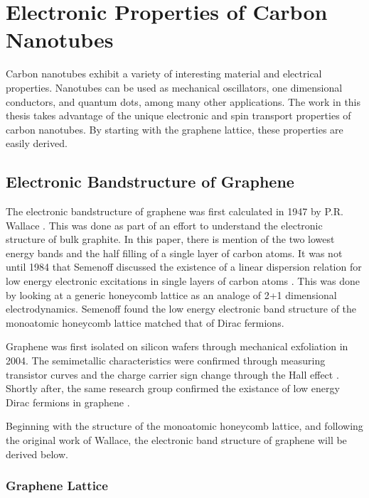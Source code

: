 
\chapter{Electronic Properties of Carbon Nanotubes}
\label{sec:CNT}

Carbon nanotubes exhibit a variety of interesting material and electrical properties. Nanotubes can be used as mechanical oscillators, one dimensional conductors, and quantum dots, among many other applications. The work in this thesis takes advantage of the unique electronic and spin transport properties of carbon nanotubes. By starting with the graphene lattice, these properties are easily derived. 

\section{Electronic Bandstructure of Graphene}

The electronic bandstructure of graphene was first calculated in 1947 by P.R. Wallace \cite{Wallace1947}. This was done as part of an effort to understand the electronic structure of bulk graphite. In this paper, there is mention of the two lowest energy bands and the half filling of a single layer of carbon atoms. It was not until 1984 that Semenoff discussed the existence of a linear dispersion relation for low energy electronic excitations in single layers of carbon atoms \cite{Semenoff1984}. This was done by looking at a generic honeycomb lattice as an analoge of 2+1 dimensional electrodynamics. Semenoff found the low energy electronic band structure of the monoatomic honeycomb lattice matched that of Dirac fermions.

Graphene was first isolated on silicon wafers through mechanical exfoliation in 2004. The semimetallic characteristics were confirmed through measuring transistor curves and the charge carrier sign change through the Hall effect \cite{Novoselov2004}. Shortly after, the same research group confirmed the existance of low energy Dirac fermions in graphene \cite{Novoselov2005}.

Beginning with the structure of the monoatomic honeycomb lattice, and following the original work of Wallace, the electronic band structure of graphene will be derived below.

\subsection{Graphene Lattice}

